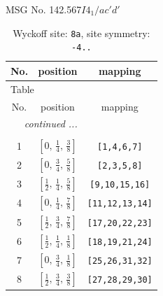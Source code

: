 \documentclass[fleqn,8pt]{jsarticle}
\begin{document}
\setcounter{MaxMatrixCols}{32}

\renewcommand{\tablename}{Table~}
\renewcommand{\figurename}{Figure~}
\begin{center}
\LARGE
MSG No. 142.567\quad$I4_{1}/ac'd'$
\end{center}
\renewcommand{\arraystretch}{1.2}
\begin{longtable}{ccc}
\caption{Wyckoff site: {\tt 8a}, site symmetry: {\tt -4..}}
 \\
 \hline \hline
No. & position & mapping \\ \hline \endfirsthead

\multicolumn{2}{l}{\tablename\ \thetable{}} \\
 \hline \hline
No. & position & mapping \\ \hline \endhead

 \hline \hline
\multicolumn{2}{r}{\footnotesize\it continued ...} \\ \endfoot

 \hline \hline
\multicolumn{2}{r}{} \\ \endlastfoot

1 & $\left[ 0,\, \frac{1}{4},\, \frac{3}{8} \right]$ & {\tt [1,4,6,7]} \\ \hline
2 & $\left[ 0,\, \frac{3}{4},\, \frac{5}{8} \right]$ & {\tt [2,3,5,8]} \\ \hline
3 & $\left[ \frac{1}{2},\, \frac{1}{4},\, \frac{5}{8} \right]$ & {\tt [9,10,15,16]} \\ \hline
4 & $\left[ 0,\, \frac{1}{4},\, \frac{7}{8} \right]$ & {\tt [11,12,13,14]} \\ \hline
5 & $\left[ \frac{1}{2},\, \frac{3}{4},\, \frac{7}{8} \right]$ & {\tt [17,20,22,23]} \\ \hline
6 & $\left[ \frac{1}{2},\, \frac{1}{4},\, \frac{1}{8} \right]$ & {\tt [18,19,21,24]} \\ \hline
7 & $\left[ 0,\, \frac{3}{4},\, \frac{1}{8} \right]$ & {\tt [25,26,31,32]} \\ \hline
8 & $\left[ \frac{1}{2},\, \frac{3}{4},\, \frac{3}{8} \right]$ & {\tt [27,28,29,30]} \\
\end{longtable}
\renewcommand{\arraystretch}{1.2}
\end{document}
